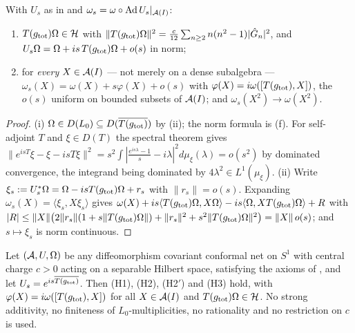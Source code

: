 \begin{theorem}[(H2) and (H3)]\label{thm:H23}
With $U_{s}$ as in  and $\omega_{s}=\omega\circ\operatorname{Ad} U_{s}|_{\mathcal A(I)}$:
\begin{enumerate}[label=\textup{(\roman*)},leftmargin=2.4em]
\item $T(g_{\rm tot})\Omega\in\mathcal H$ with
 $\|T(g_{\rm tot})\Omega\|^{2}=\frac{c}{12}\sum_{n\ge2}n(n^{2}-1)|\hat G_{n}|^{2}$, and
 $U_{s}\Omega=\Omega+is\,T(g_{\rm tot})\Omega+o(s)$ in norm;
\item for \emph{every} $X\in\mathcal A(I)$ --- not merely on a dense subalgebra ---
 $\omega_{s}(X)=\omega(X)+s\varphi(X)+o(s)$ with $\varphi(X)=i\omega([T(g_{\rm tot}),X])$, the $o(s)$
 uniform on bounded subsets of $\mathcal A(I)$; and $\omega_{s}(X^{2})\to\omega(X^{2})$.
\end{enumerate}
\end{theorem}

\begin{proof}
(i) $\Omega\in D(L_{0})\subseteq D(\overline{T(g_{\rm tot})})$ by (ii); the norm formula is
(f).  For self-adjoint $T$ and $\xi\in D(T)$ the spectral theorem gives
$\|e^{isT}\xi-\xi-isT\xi\|^{2}=s^{2}\int|\frac{e^{is\lambda}-1}{s}-i\lambda|^{2}d\mu_{\xi}(\lambda)=o(s^{2})$
by dominated convergence, the integrand being dominated by $4\lambda^{2}\in L^{1}(\mu_{\xi})$.
(ii) Write $\xi_{s}:=U_{s}^{*}\Omega=\Omega-isT(g_{\rm tot})\Omega+r_{s}$ with $\|r_{s}\|=o(s)$.  Expanding
$\omega_{s}(X)=\langle\xi_{s},X\xi_{s}\rangle$ gives
$\omega(X)+is\langle T(g_{\rm tot})\Omega,X\Omega\rangle-is\langle\Omega,XT(g_{\rm tot})\Omega\rangle+R$
with $|R|\le\|X\|\bigl(2\|r_{s}\|(1+s\|T(g_{\rm tot})\Omega\|)+\|r_{s}\|^{2}+s^{2}
\|T(g_{\rm tot})\Omega\|^{2}\bigr)=\|X\|\,o(s)$; and $s\mapsto\xi_{s}$ is norm continuous.
\end{proof}

\begin{theorem}[implementation]\label{thm:impl}
Let $(\mathcal A,U,\Omega)$ be any diffeomorphism covariant conformal net on $S^{1}$ with central charge $c>0$
acting on a separable Hilbert space, satisfying the axioms of , and let
$U_{s}=e^{is\overline{T(g_{\rm tot})}}$.  Then \textup{(H1)}, \textup{(H2)}, \textup{(H2$'$)} and
\textup{(H3)} hold, with $\varphi(X)=i\omega([T(g_{\rm tot}),X])$ for all $X\in\mathcal A(I)$ and
$T(g_{\rm tot})\Omega\in\mathcal H$.  No strong additivity, no finiteness of $L_{0}$-multiplicities, no
rationality and no restriction on $c$ is used.
\end{theorem}

